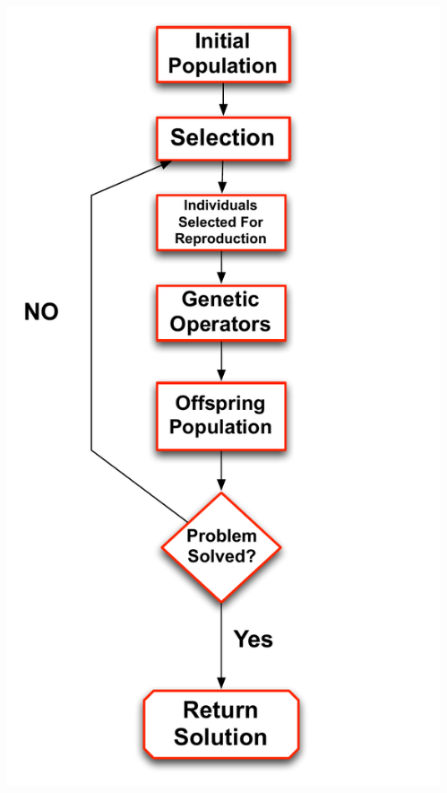\documentclass{beamer}
\begin{document}
\begin{frame}
\begin{columns}[T]
\begin{column}{0.6\textwidth}
\begin{itemize}
\end{itemize}
\end{column}
\begin{column}{0.4\textwidth}
   \includegraphics[height=0.85\textheight]{Illustrations/ECdiagram.pdf}
       \\
\end{column}
\end{columns}

\end{frame}
\end{document}
